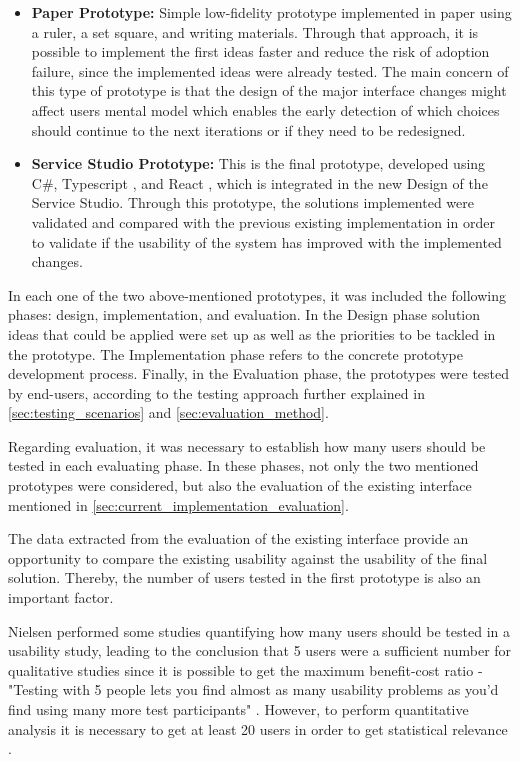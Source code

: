 \begin{itemize}
    \item \textbf{Paper Prototype: } Simple low-fidelity prototype implemented in paper using a ruler, a set square, and writing materials. Through that approach, it is possible to implement the first ideas faster and reduce the risk of adoption failure, since the implemented ideas were already tested. The main concern of this type of prototype is that the design of the major interface changes might affect users mental model which enables the early detection of which choices should continue to the next iterations or if they need to be redesigned.
    \item \textbf{Service Studio Prototype: } This is the final prototype, developed using C\#, Typescript \cite{typescript}, and React \cite{react}, which is integrated in the new Design of the Service Studio. Through this prototype, the solutions implemented were validated and compared with the previous existing implementation in order to validate if the usability of the system has improved with the implemented changes.
\end{itemize}

In each one of the two above-mentioned prototypes, it was included the following phases: design, implementation, and evaluation. In the Design phase solution ideas that could be applied were set up as well as the priorities to be tackled in the prototype. The Implementation phase refers to the concrete prototype development process. Finally, in the Evaluation phase, the prototypes were tested by end-users, according to the testing approach further explained in \ref{sec:testing_scenarios} and \ref{sec:evaluation_method}.

Regarding evaluation, it was necessary to establish how many users should be tested in each evaluating phase. In these phases, not only the two mentioned prototypes were considered, but also the evaluation of the existing interface mentioned in \ref{sec:current_implementation_evaluation}. 

The data extracted from the evaluation of the existing interface provide an opportunity to compare the existing usability against the usability of the final solution. Thereby, the number of users tested in the first prototype is also an important factor.

Nielsen performed some studies quantifying how many users should be tested in a usability study, leading to the conclusion that 5 users were a sufficient number for qualitative studies since it is possible to get the maximum benefit-cost ratio - "Testing with 5 people lets you find almost as many usability problems as you'd find using many more test participants" \cite{why_you_only_need_to_test_with_5_users} \cite{how_many_test_users_in_a_usability_study}. However, to perform quantitative analysis it is necessary to get at least 20 users in order to get statistical relevance \cite{how_many_test_users_in_a_usability_study}.

